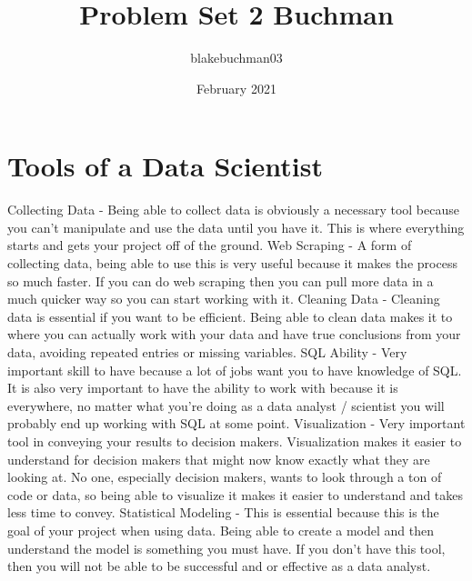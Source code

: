 \documentclass{article}
\title{Problem Set 2 Buchman}
\author{blakebuchman03 }
\date{February 2021}
\begin{document}
\maketitle

\section{Tools of a Data Scientist}
Collecting Data - Being able to collect data is obviously a necessary tool because you can't manipulate and use the data until you have it. This is where everything starts and gets your project off of the ground. 
\newline
\newline Web Scraping - A form of collecting data, being able to use this is very useful because it makes the process so much faster. If you can do web scraping then you can pull more data in a much quicker way so you can start working with it.  
\newline
\newline Cleaning Data - Cleaning data is essential if you want to be efficient. Being able to clean data makes it to where you can actually work with your data and have true conclusions from your data, avoiding repeated entries or missing variables. 
\newline
\newline SQL Ability - Very important skill to have because a lot of jobs want you to have knowledge of SQL. It is also very important to have the ability to work with because it is everywhere, no matter what you're doing as a data analyst / scientist you will probably end up working with SQL at some point. 
\newline
\newline Visualization - Very important tool in conveying your results to decision makers. Visualization makes it easier to understand for decision makers that might now know exactly what they are looking at. No one, especially decision makers, wants to look through a ton of code or data, so being able to visualize it makes it easier to understand and takes less time to convey. 
\newline
\newline Statistical Modeling - This is essential because this is the goal of your project when using data. Being able to create a model and then understand the model is something you must have. If you don't have this tool, then you will not be able to be successful and or effective as a data analyst. 
\end{document}
